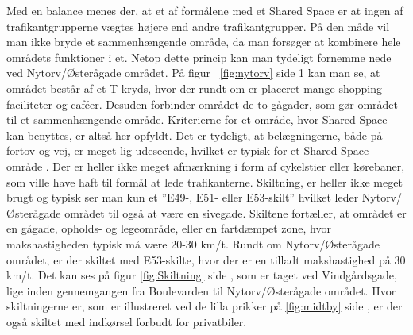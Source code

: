 Med en balance menes der, at et af formålene med et Shared Space er at ingen af trafikantgrupperne vægtes højere end andre trafikantgrupper. På den måde vil man ikke bryde et sammenhængende område, da man forsøger at kombinere hele områdets funktioner i et. Netop dette princip kan man tydeligt fornemme nede ved Nytorv/Østerågade området.  På figur ~\cref{fig:nytorv} side \pageref*{fig:nytorv} 1 kan man se, at området består af et T-kryds, hvor der rundt om er placeret mange shopping faciliteter og caféer. Desuden forbinder området de to gågader, som gør området til et sammenhængende område. Kriterierne for et område, hvor Shared Space kan benyttes, er altså her opfyldt.
Det er tydeligt, at belægningerne, både på fortov og vej, er meget lig udeseende, hvilket er typisk for et Shared Space område \autocite{reglershared}. Der er heller ikke meget afmærkning i form af cykelstier eller kørebaner, som ville have haft til formål at lede trafikanterne. Skiltning, er heller ikke meget brugt og typisk ser man kun et ”E49-, E51- eller E53-skilt” hvilket leder Nytorv/Østerågade området til også at være en sivegade. Skiltene fortæller, at området er en gågade, opholds- og legeområde, eller en fartdæmpet zone, hvor makshastigheden typisk må være 20-30 km/t.  Rundt om Nytorv/Østerågade området, er der skiltet med E53-skilte, hvor der er en tilladt makshastighed på 30 km/t. Det kan ses på figur \cref{fig:Skiltning} side \pageref{fig:Skiltning}, som er taget ved Vindgårdsgade, lige inden gennemgangen fra Boulevarden til Nytorv/Østerågade området. Hvor skiltningerne er, som er illustreret ved de lilla prikker på \cref{fig:midtby} side \pageref{fig:midtby}, er der også skiltet med indkørsel forbudt for privatbiler. 

